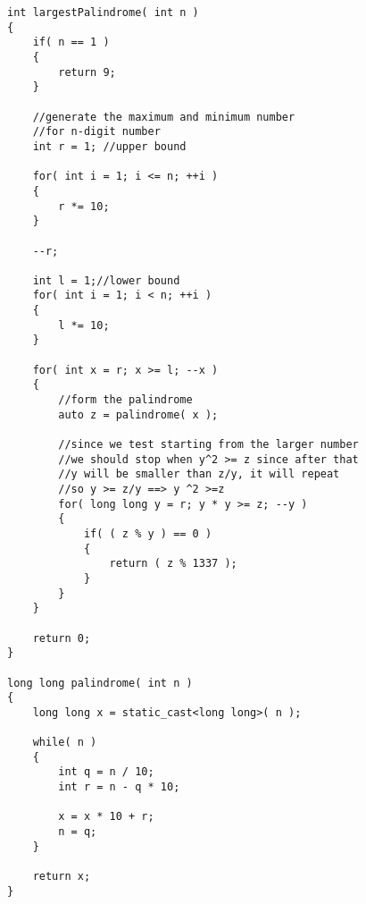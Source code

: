 \setcounter{lstlisting}{0}
\begin{lstlisting}[style=customc, caption={Try All From Largest}]
int largestPalindrome( int n )
{
    if( n == 1 )
    {
        return 9;
    }

    //generate the maximum and minimum number
    //for n-digit number
    int r = 1; //upper bound

    for( int i = 1; i <= n; ++i )
    {
        r *= 10;
    }

    --r;

    int l = 1;//lower bound
    for( int i = 1; i < n; ++i )
    {
        l *= 10;
    }

    for( int x = r; x >= l; --x )
    {
        //form the palindrome
        auto z = palindrome( x );

        //since we test starting from the larger number
        //we should stop when y^2 >= z since after that
        //y will be smaller than z/y, it will repeat
        //so y >= z/y ==> y ^2 >=z
        for( long long y = r; y * y >= z; --y )
        {
            if( ( z % y ) == 0 )
            {
                return ( z % 1337 );
            }
        }
    }

    return 0;
}

long long palindrome( int n )
{
    long long x = static_cast<long long>( n );

    while( n )
    {
        int q = n / 10;
        int r = n - q * 10;

        x = x * 10 + r;
        n = q;
    }

    return x;
}
\end{lstlisting}